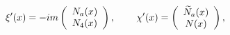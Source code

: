 \begin{equation}
\xi ^{\prime }(x)=-im\left(
\begin{array}{c}
N_a(x) \\
N_4(x)
\end{array}
\right) ,\hspace{0.3in}\chi ^{\prime }(x)=\left(
\begin{array}{c}
\widetilde{N}_a(x) \\
N(x)
\end{array}
\right) , \label{32}
\end{equation}

